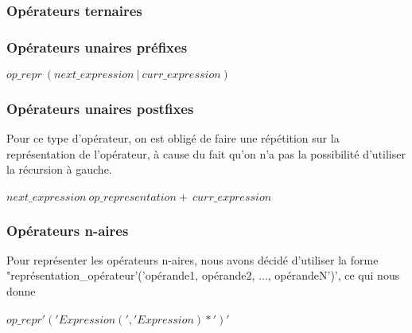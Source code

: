 \documentclass{article}
\begin{document}
\subsubsection{Opérateurs ternaires}
\subsubsection{Opérateurs unaires préfixes}
$op\_repr \ (next\_expression \ | \ curr\_expression)$
\subsubsection{Opérateurs unaires postfixes}
Pour ce type d'opérateur, on est obligé de faire une répétition sur la représentation de l'opérateur, à cause du fait qu'on n'a pas la possibilité d'utiliser la récursion à gauche. \\ \\
$next\_expression \ op\_representation+ \ curr\_expression$
\subsubsection{Opérateurs n-aires}
Pour représenter les opérateurs n-aires, nous avons décidé d'utiliser la forme "représentation\_opérateur'('opérande1, opérande2, ..., opérandeN')', ce qui nous donne \\ \\
$op\_repr'('Expression(','Expression)*')'$
\end{document}
